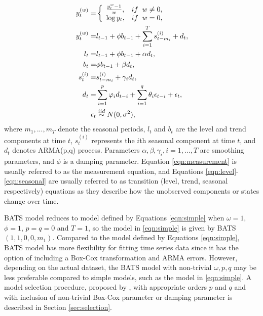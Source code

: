 \documentclass{uwstat572}
\begin{document}
\begin{subequations}
\begin{align}
y_t^{  (w)} = &\left\{
\begin{array}{l l}
\frac{y_t^{w}-1}{w}, & if \;\; w \neq 0,\\
\log y_t, & if\;\; w=0,\\
\end{array} \right. \\
y_t^{  (w)}=&l_{t-1}+\phi b_{t-1} +\sum\limits_{i=1}^T s_{t-m_i}^{(i)}+d_t, \label{eqn:measurement} \\
l_t=&l_{t-1}+\phi b_{t-1}+\alpha d_t,\label{eqn:level}  \\
 b_t=&\phi b_{t-1}+\beta d_t, \label{eqn:trend} \\
 s_t^{(i)}=&s_{t-m_i}^{(i)}+\gamma_i d_t, \label{eqn:seasonal} \\
 d_t=&\sum\limits_{i=1}^p \varphi_id_{t-i} +\sum\limits_{i=1}^q \theta_i \epsilon_{t-i}+\epsilon_t, \\
 \epsilon_t &  \stackrel{iid}{\sim} N(0,\sigma^2),
\end{align}
\end{subequations}
\noindent where $m_1,..., m_T$ denote the seasonal periods, $l_t$ and $b_t$ are the level and trend components at time $t$, $s_t^{(i)}$ represents the $i$th seasonal component at time $t$, and $d_t$ denotes ARMA(p,q) process. Parameters $\alpha, \beta, \gamma_i, i=1,...,T$ are smoothing parameters, and $\phi$ is a damping parameter. Equation \ref{eqn:measurement} is usually referred to as the measurement equation, and Equations \ref{eqn:level}-\ref{eqn:seasonal} are usually referred to as transition (level, trend, seasonal respectively) equations as they describe how the unobserved components or states change over time. 

BATS model reduces to model defined by Equations \ref{eqn:simple} when $\omega=1$, $\phi=1$, $p=q=0$ and $T=1$, so the model in \ref{eqn:simple} is given by BATS$(1,1,0,0, m_1)$. Compared to the model defined by Equations \ref{eqn:simple}, BATS model has more flexibility for fitting time series data since it has the option of including a Box-Cox transformation and ARMA errors. However, depending on the actual dataset, the BATS model with non-trivial $\omega, p, q$ may be less preferable compared to simple models, such as the model in \ref{eqn:simple}. A model selection procedure, proposed by  \citet{de2011forecasting}, with appropriate orders $p$ and $q$ and with inclusion of non-trivial Box-Cox parameter or damping parameter is described in Section \ref{sec:selection}. 
\end{document}
